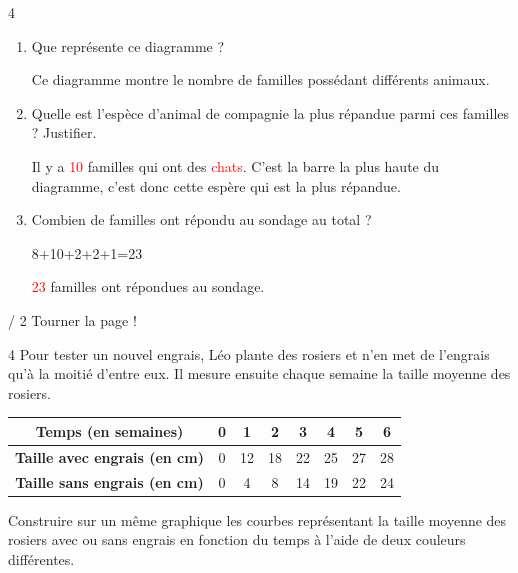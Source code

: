 \documentclass[a4paper]{book}
\begin{document}
{\begin{exerciceNote}{4}
\begin{minipage}{0.55\linewidth}
            \begin{enumerate}
                \item Que représente ce diagramme ? 

                Ce diagramme montre le nombre de familles possédant différents animaux.

                \item Quelle est l'espèce d'animal de compagnie la plus répandue parmi ces familles ? Justifier.

                Il y a \textcolor{red}{10} familles qui ont des \textcolor{red}{chats}. C'est la barre la plus haute du diagramme, c'est donc cette espère qui est la plus répandue.

                \item Combien de familles ont répondu au sondage au total ?

                8+10+2+2+1=23

                \textcolor{red}{23} familles ont répondues au sondage.
            \end{enumerate}
        \end{minipage}
    \end{exerciceNote}


    \vfill
    \thepage / 2 \hfill Tourner la page !
\newpage


    \begin{exerciceNote}{4}
        Pour tester un nouvel engrais, Léo plante des rosiers et n'en met de l'engrais qu'à la moitié d'entre eux. Il mesure ensuite chaque semaine la taille moyenne des rosiers.
        
        \begin{center}
            \begin{tabular}{|c|c|c|c|c|c|c|c|}
                \hline
                \textbf{Temps (en semaines)} & \textbf{0} & \textbf{1} & \textbf{2} & \textbf{3} & \textbf{4} & \textbf{5} & \textbf{6} \\
                \hline
                \textbf{Taille avec engrais (en cm)} & 0 & 12 & 18 & 22 & 25 & 27 & 28 \\
                \hline
                \textbf{Taille sans engrais (en cm)} & 0 & 4 & 8 & 14 & 19 & 22 & 24 \\
                \hline
            \end{tabular}
        \end{center}

        Construire sur un même graphique les courbes représentant la taille moyenne des rosiers avec ou sans engrais en fonction du temps à l'aide de deux couleurs différentes. 


\end{exerciceNote}}
\end{document}
